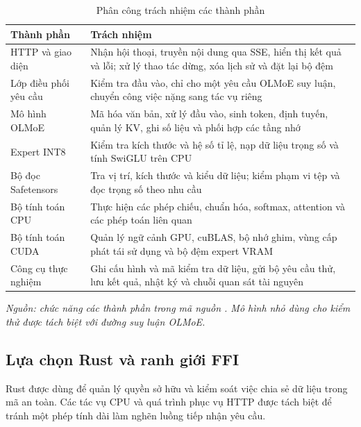 \begin{table}[htbp]
\centering
\setlength{\tabcolsep}{6pt}
\small
\caption{Phân công trách nhiệm các thành phần}
\label{tab:bang_3_1}
\begin{tabularx}{\textwidth}{>{\RaggedRight\arraybackslash}p{4.5cm} >{\RaggedRight\arraybackslash}X}
\toprule
\rowcolor{tableheader}
\textbf{Thành phần} & \textbf{Trách nhiệm} \\
\midrule
HTTP và giao diện & Nhận hội thoại, truyền nội dung qua SSE, hiển thị kết quả và lỗi; xử lý thao tác dừng, xóa lịch sử và đặt lại bộ đệm \\
Lớp điều phối yêu cầu & Kiểm tra đầu vào, chỉ cho một yêu cầu OLMoE suy luận, chuyển công việc nặng sang tác vụ riêng \\
Mô hình OLMoE & Mã hóa văn bản, xử lý đầu vào, sinh token, định tuyến, quản lý KV, ghi số liệu và phối hợp các tầng nhớ \\
Expert INT8 & Kiểm tra kích thước và hệ số tỉ lệ, nạp dữ liệu trọng số và tính SwiGLU trên CPU \\
Bộ đọc Safetensors & Tra vị trí, kích thước và kiểu dữ liệu; kiểm phạm vi tệp và đọc trọng số theo nhu cầu \\
Bộ tính toán CPU & Thực hiện các phép chiếu, chuẩn hóa, softmax, attention và các phép toán liên quan \\
Bộ tính toán CUDA & Quản lý ngữ cảnh GPU, cuBLAS, bộ nhớ ghim, vùng cấp phát tái sử dụng và bộ đệm expert VRAM \\
Công cụ thực nghiệm & Ghi cấu hình và mã kiểm tra dữ liệu, gửi bộ yêu cầu thử, lưu kết quả, nhật ký và chuỗi quan sát tài nguyên \\
\bottomrule
\end{tabularx}
\vspace{3pt}\par\noindent\footnotesize\textit{Nguồn: chức năng các thành phần trong mã nguồn \cite{moe_tierengine_arch}. Mô hình nhỏ dùng cho kiểm thử được tách biệt với đường suy luận OLMoE.}
\end{table}

\subsection{Lựa chọn Rust và ranh giới FFI}

Rust được dùng để quản lý quyền sở hữu và kiểm soát việc chia sẻ dữ liệu trong mã an toàn. Các tác vụ CPU và quá trình phục vụ HTTP được tách biệt để tránh một phép tính dài làm nghẽn luồng tiếp nhận yêu cầu.

